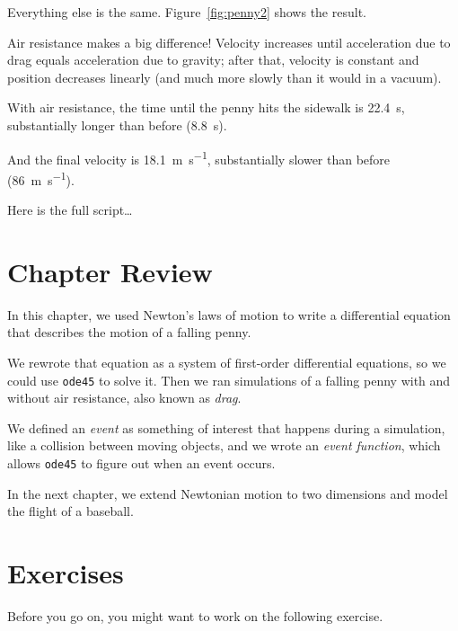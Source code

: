 \documentclass[../../book.tex]{subfiles}
\begin{document}
Everything else is the same.  Figure~\ref{fig:penny2} shows the result.

Air resistance makes a big difference! Velocity increases until
acceleration due to drag equals acceleration due to gravity; after that, velocity is constant and position decreases linearly (and much more slowly than it would in a vacuum).

With air resistance, the time until the penny hits the sidewalk is \SI{22.4}{\second}, substantially longer than before (\SI{8.8}{\second}).

And the final velocity is \SI{18.1}{\meter \per \second}, substantially slower than before (\SI{86}{\meter \per \second}).

Here is the full script\dots


\section{Chapter Review}

In this chapter, we used Newton's laws of motion to write a differential equation that describes the motion of a falling penny.

We rewrote that equation as a system of first-order differential equations, so we could use \lstinline{ode45} to solve it.  Then we ran simulations of a falling penny with and without air resistance, also known as \emph{drag}.

We defined an \emph{event} as something of interest that happens during a simulation, like a collision between moving objects, and we wrote an \emph{event function}, which allows \lstinline{ode45} to figure out when an event occurs.

In the next chapter, we extend Newtonian motion to two dimensions and model the flight of a baseball.


\section{Exercises}

Before you go on, you might want to work on the following exercise.
\end{document}
